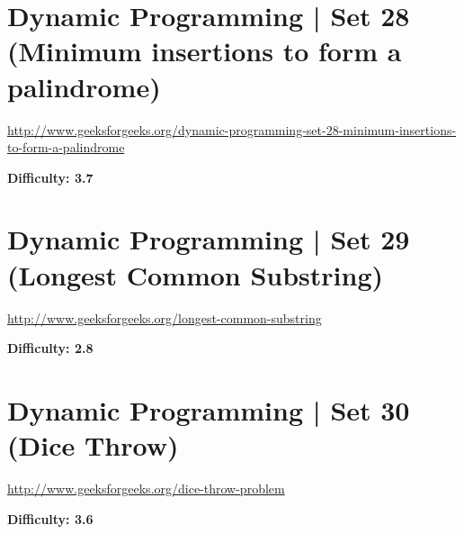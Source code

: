 \section{Dynamic Programming | Set 28 (Minimum insertions to form a palindrome)
  \label{secGFGDPSet28MinmInsertnFormPalin}}

\url{http://www.geeksforgeeks.org/dynamic-programming-set-28-minimum-insertions-to-form-a-palindrome}

\textbf{Difficulty: 3.7}


\textbf{}

\RayNotesBegin



\RayNotesEnd

\textbf{}



\section{Dynamic Programming | Set 29 (Longest Common Substring)
  \label{secGFGDPSet29LongstCommSubstr}}

\url{http://www.geeksforgeeks.org/longest-common-substring}

\textbf{Difficulty: 2.8}


\textbf{}

\RayNotesBegin



\RayNotesEnd

\textbf{}



\section{Dynamic Programming | Set 30 (Dice Throw)
  \label{secGFGDPSet30DiceThrow}}

\url{http://www.geeksforgeeks.org/dice-throw-problem}

\textbf{Difficulty: 3.6}

\textbf{}

\RayNotesBegin



\RayNotesEnd

\textbf{}


